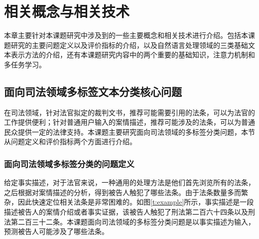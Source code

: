 
\chapter{相关概念与相关技术}
本章主要针对本课题研究中涉及到的一些主要概念和相关技术进行介绍。包括本课题研究的主要问题定义以及评价指标的介绍，以及自然语言处理领域的三类基础文本表示方法的介绍，还有本课题研究内容中的两个重要的基础知识，注意力机制和多任务学习。
\section{面向司法领域多标签文本分类核心问题}
在司法领域，针对法官拟定的裁判文书，推荐可能需要引用的法条，可以为法官的工作提供便利；针对普通用户输入的案情描述，推荐可能涉及的法条，可以为普通民众提供一定的法律支持。本课题主要研究面向司法领域的多标签分类问题，本节从问题定义和评价指标两个方面进行介绍。
\subsection{面向司法领域多标签分类的问题定义}


给定事实描述，对于法官来说，一种通用的处理方法是他们首先浏览所有的法条，之后根据对案情描述的分析，得到被告人触犯了哪些法条。由于法条数量多而繁杂，因此快速定位相关法条是非常困难的。如图\ref{t:example}所示，事实描述是一段描述被告人的案情介绍或者事实证据，该被告人触犯了刑法第二百六十四条以及刑法第二百三十二条。本课题面向司法领域的多标签分类问题是以事实描述为输入，预测被告人可能涉及了哪些法条。



